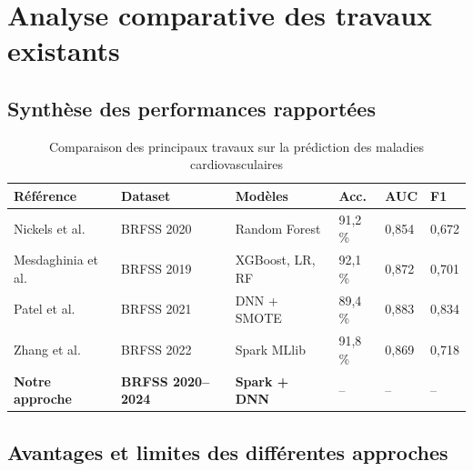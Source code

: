 \documentclass[12pt,a4paper]{report}
\begin{document}
\section{Analyse comparative des travaux existants}

\subsection{Synthèse des performances rapportées}

\begin{table}[H]
\centering
\caption{Comparaison des principaux travaux sur la prédiction des maladies cardiovasculaires}
\label{tab:etat_art}
\begin{tabularx}{\textwidth}{L{2.8cm} L{2cm} L{3cm} C{1.5cm} C{1.5cm} C{1.5cm}}
\toprule
\textbf{Référence} & \textbf{Dataset} & \textbf{Modèles} & \textbf{Acc.} & \textbf{AUC} & \textbf{F1} \\
\midrule
Nickels et al. \cite{nickels2023}
  & BRFSS 2020 & Random Forest & 91,2\,\% & 0,854 & 0,672 \\
\addlinespace
Mesdaghinia et al. \cite{mesdaghinia2022}
  & BRFSS 2019 & XGBoost, LR, RF & 92,1\,\% & 0,872 & 0,701 \\
\addlinespace
Patel et al. \cite{patel2023}
  & BRFSS 2021 & DNN + SMOTE & 89,4\,\% & 0,883 & 0,834 \\
\addlinespace
Zhang et al. \cite{zhang2023}
  & BRFSS 2022 & Spark MLlib & 91,8\,\% & 0,869 & 0,718 \\
\addlinespace
\textbf{Notre approche}
  & \textbf{BRFSS 2020--2024} & \textbf{Spark + DNN} & -- & -- & -- \\
\bottomrule
\end{tabularx}
\end{table}

\subsection{Avantages et limites des différentes approches}
\end{document}
